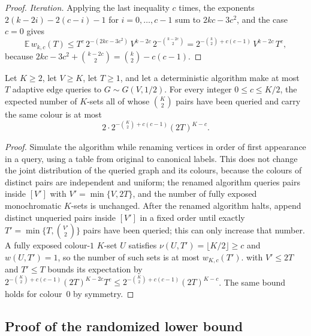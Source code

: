 \begin{proof}
\emph{Iteration.}  Applying the last inequality $c$ times, the exponents
$2(k-2i)-2(c-i)-1$ for $i=0,\ldots,c-1$ sum to $2kc-3c^2$, and the case
$c=0$ gives
\[
 \mathbb E\,w_{k,c}(T)
 \le T^c\,2^{-(2kc-3c^2)}\,V^{k-2c}\,2^{-\binom{k-2c}2}
 =2^{-\binom k2+c(c-1)}\,V^{k-2c}\,T^c,
\]
because $2kc-3c^2+\binom{k-2c}2=\binom k2-c(c-1)$.
\end{proof}

\begin{corollary}\label{cor:exposed}
Let $K\ge2$, let $V\ge K$, let $T\ge1$, and let a deterministic algorithm
make at most $T$ adaptive edge queries to $G\sim G(V,1/2)$.  For every integer
$0\le c\le K/2$, the expected number of $K$-sets all of whose $\binom K2$
pairs have been queried and carry the same colour is at most
\[
 2\cdot2^{-\binom K2+c(c-1)}(2T)^{K-c}.
\]
\end{corollary}

\begin{proof}
Simulate the algorithm while renaming vertices in order of first
appearance in a query, using a table from original to canonical labels.
This does not change the joint distribution of the queried graph and its
colours, because the colours of distinct pairs are independent and uniform;
the renamed algorithm queries pairs inside $[V']$ with $V'=\min\{V,2T\}$,
and the number of fully exposed monochromatic $K$-sets is unchanged.  After
the renamed algorithm halts, append distinct unqueried pairs inside $[V']$
in a fixed order until exactly $T'=\min\{T,\binom{V'}2\}$ pairs have been
queried; this can only increase that number.  A fully exposed colour-$1$
$K$-set $U$ satisfies $\nu(U,T')=\lfloor K/2\rfloor\ge c$ and $w(U,T')=1$,
so the number of such sets is at most $w_{K,c}(T')$.
 with $V'\le2T$ and $T'\le T$ bounds its expectation
by
$2^{-\binom K2+c(c-1)}(2T)^{K-2c}T^c\le2^{-\binom K2+c(c-1)}(2T)^{K-c}$.
The same bound holds for colour~$0$ by symmetry.
\end{proof}

\subsection{Proof of the randomized lower bound}
\label{app:classical-lower-proof}


